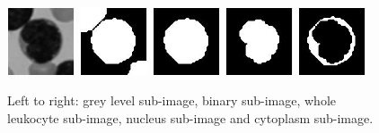 {	\begin{figure}[h]
		\centering
		\includegraphics[width=0.18\textwidth]{images/crop-Fig14-1}
		\includegraphics[width=0.18\textwidth]{images/crop-Fig14-2}
		\includegraphics[width=0.18\textwidth]{images/crop-Fig14-3}
		\includegraphics[width=0.18\textwidth]{images/crop-Fig15-3}
		\includegraphics[width=0.18\textwidth]{images/crop-Fig15-4}
		\caption[Image cleaning procedure.]{\label{fig:example14}Left to right: grey level sub-image, binary sub-image, whole leukocyte sub-image, nucleus sub-image and cytoplasm sub-image.}
	\end{figure}
	
}
